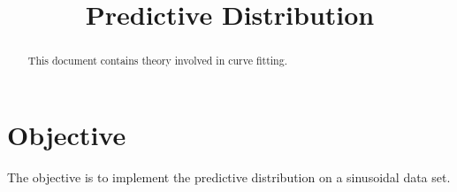 \documentclass[journal,12pt,twocolumn]{IEEEtran}
\begin{document}
\makeatletter
{}
\makeatother
\let\StandardTheFigure\thefigure
\let\vec\mathbf
\renewcommand{\thefigure}{\theproblem}
\def\putbox#1#2#3{\makebox[0in][l]{\makebox[#1][l]{}\raisebox{\baselineskip}[0in][0in]{\raisebox{#2}[0in][0in]{#3}}}}
     \def\rightbox#1{\makebox[0in][r]{#1}}
     \def\centbox#1{\makebox[0in]{#1}}
     \def\topbox#1{\raisebox{-\baselineskip}[0in][0in]{#1}}
\vspace{3cm}
\title{Predictive Distribution}
\maketitle
\newpage
\bigskip
\renewcommand{\thefigure}{\theenumi}
\renewcommand{\thetable}{\theenumi}
\begin{abstract}
This document contains theory involved in curve fitting.
\end{abstract}
\section{\textbf{Objective}}
The objective is to implement the predictive distribution on a sinusoidal data set.
\end{document}
